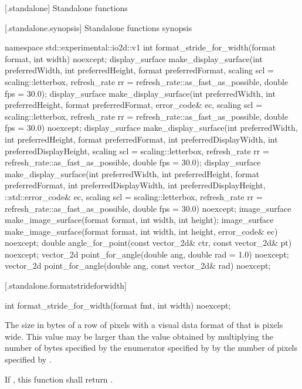  [\iotwod.standalone] {Standalone functions}

 [\iotwod.standalone.synopsis] {Standalone functions synopsis}

\begin{codeblock}
namespace std::experimental::io2d::v1 {
  int format_stride_for_width(format format, int width) noexcept;
  display_surface make_display_surface(int preferredWidth,
    int preferredHeight, format preferredFormat,
    scaling scl = scaling::letterbox,
    refresh_rate rr = refresh_rate::as_fast_as_possible, double fps = 30.0);
  display_surface make_display_surface(int preferredWidth,
    int preferredHeight, format preferredFormat, error_code& ec,
    scaling scl = scaling::letterbox,
    refresh_rate rr = refresh_rate::as_fast_as_possible, double fps = 30.0) noexcept;
  display_surface make_display_surface(int preferredWidth,
    int preferredHeight, format preferredFormat, int preferredDisplayWidth, 
    int preferredDisplayHeight, scaling scl = scaling::letterbox,
    refresh_rate rr = refresh_rate::as_fast_as_possible, double fps = 30.0);
  display_surface make_display_surface(int preferredWidth,
    int preferredHeight, format preferredFormat, int preferredDisplayWidth, 
    int preferredDisplayHeight, ::std::error_code& ec,
    scaling scl = scaling::letterbox,
    refresh_rate rr = refresh_rate::as_fast_as_possible, double fps = 30.0) noexcept;
  image_surface make_image_surface(format format, int width, int height);
  image_surface make_image_surface(format format, int width, int height, 
    error_code& ec) noexcept;
  double angle_for_point(const vector_2d& ctr, const vector_2d& pt) noexcept;
  vector_2d point_for_angle(double ang, double rad = 1.0) noexcept;
  vector_2d point_for_angle(double ang, const vector_2d& rad) noexcept;
}
\end{codeblock}

 [\iotwod.standalone.formatstrideforwidth] {}

%
\begin{itemdecl}
int format_stride_for_width(format fmt, int width) noexcept;
\end{itemdecl}
\begin{itemdescr}
\pnum
\returns
The size in bytes of a row of pixels with a visual data format of  that is  pixels wide. This value may be larger than the value obtained by multiplying the number of bytes specified by the  enumerator specified by  by the number of pixels specified by .

\pnum
If , this function shall return .
\end{itemdescr}

